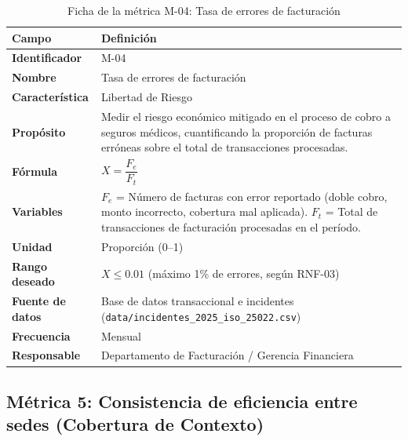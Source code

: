 \documentclass[12pt,a4paper]{article}
\begin{document}
\begin{table}[H]
\centering
\caption{Ficha de la m\'etrica M-04: Tasa de errores de facturaci\'on}
\begin{tabularx}{\textwidth}{l X}
\toprule
\textbf{Campo} & \textbf{Definici\'on} \\
\midrule
\textbf{Identificador} & M-04 \\
\textbf{Nombre} & Tasa de errores de facturaci\'on \\
\textbf{Caracter\'istica} & Libertad de Riesgo \\
\textbf{Prop\'osito} & Medir el riesgo econ\'omico mitigado en el proceso de cobro a seguros m\'edicos, cuantificando la proporci\'on de facturas err\'oneas sobre el total de transacciones procesadas. \\
\textbf{F\'ormula} & $X = \dfrac{F_e}{F_t}$ \\
\textbf{Variables} & $F_e$ = N\'umero de facturas con error reportado (doble cobro, monto incorrecto, cobertura mal aplicada). \newline $F_t$ = Total de transacciones de facturaci\'on procesadas en el per\'iodo. \\
\textbf{Unidad} & Proporci\'on (0--1) \\
\textbf{Rango deseado} & $X \le 0.01$ (m\'aximo 1\% de errores, seg\'un RNF-03) \\
\textbf{Fuente de datos} & Base de datos transaccional e incidentes (\texttt{data/incidentes\_2025\_iso\_25022.csv}) \\
\textbf{Frecuencia} & Mensual \\
\textbf{Responsable} & Departamento de Facturaci\'on / Gerencia Financiera \\
\bottomrule
\end{tabularx}
\end{table}

\subsection{M\'etrica 5: Consistencia de eficiencia entre sedes (Cobertura de Contexto)}
\end{document}
